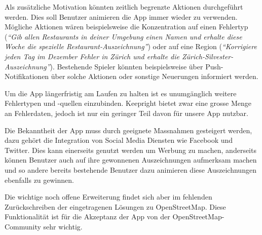 Als zusätzliche Motivation könnten zeitlich begrenzte Aktionen durchgeführt werden.
Dies soll Benutzer animieren die App immer wieder zu verwenden. 
Mögliche Aktionen wären beispielsweise die Konzentration auf einen Fehlertyp (\emph{"`Gib allen Restaurants in deiner Umgebung einen Namen und erhalte diese Woche die spezielle Restaurant-Auszeichnung"'}) oder auf eine Region (\emph{"`Korrigiere jeden Tag im Dezember Fehler in Zürich und erhalte die Zürich-Silvester-Auszeichnung"'}).
Bestehende Spieler könnten beispielsweise über Push-Notifikationen über solche Aktionen oder sonstige Neuerungen informiert werden.

Um die App längerfristig am Laufen zu halten ist es unumgänglich weitere Fehlertypen und -quellen einzubinden. 
Keepright bietet zwar eine grosse Menge an Fehlerdaten, jedoch ist nur ein geringer Teil davon für unsere App nutzbar.

Die Bekanntheit der App muss durch geeignete Massnahmen gesteigert werden, dazu gehört die Integration von Social Media Diensten wie Facebook und Twitter.
Dies kann einerseits genutzt werden um Werbung zu machen, anderseits können Benutzer auch auf ihre gewonnenen Auszeichnungen aufmerksam machen und so andere bereits bestehende Benutzer dazu animieren diese Auszeichnungen ebenfalls zu gewinnen.

Die wichtige noch offene Erweiterung findet sich aber im fehlenden Zurückschreiben der eingetragenen Lösungen zu \gls{OpenStreetMap}.
Diese Funktionalität ist für die Akzeptanz der App von der \gls{OpenStreetMap}-Community sehr wichtig.